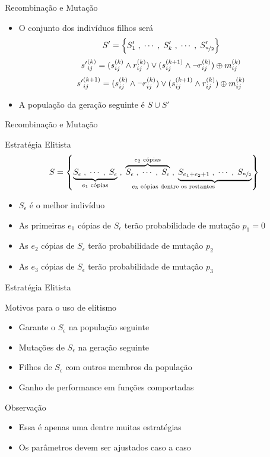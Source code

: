 \begin{frame}{Recombinação e Mutação}
  \begin{itemize}
    \item O conjunto dos indivíduos filhos será
          $$ S' = \left\{ S'_1\;, \;\cdots\;,  \;S'_k\;, \;\cdots\;, \;S'_{\nicefrac{n}{2}} \right\} $$
          $$ {s'}^{(k)}_{ij} = ({s}^{(k)}_{ij} \land {r}^{(k)}_{ij}) \lor ({s}^{(k + 1)}_{ij} \land \lnot {r}^{(k)}_{ij}) \oplus {m}^{(k)}_{ij} $$
          $$ {s'}^{(k + 1)}_{ij} = ({s}^{(k)}_{ij} \land \lnot {r}^{(k)}_{ij}) \lor ({s}^{(k + 1)}_{ij} \land {r}^{(k)}_{ij}) \oplus {m}^{(k)}_{ij} $$
    \item A população da geração seguinte é $ S \cup S' $
  \end{itemize}
\end{frame}

\begin{frame}{Recombinação e Mutação}
  
\end{frame}

\begin{frame}{Estratégia Elitista}
  $$
    S =
    \left\{
    \underbrace{S_{\epsilon}\;, \mathdots,  \;S_{\epsilon}}_{e_1 \text{ cópias}}\;,\;
    \overbrace{S_{\epsilon}\;, \mathdots,  \;S_{\epsilon}}^{e_2 \text{ cópias}}\;,\;
    \underbrace{S_{e_1 + e_2 + 1}\;, \mathdots,  \;S_{\nicefrac{n}{2}}}_{\mathllap{e_3 \text{ cópias dentre os restantes}}}
    \right\}
  $$
  \begin{itemize}
    \item $S_\epsilon$ é o melhor indivíduo
    \item As primeiras $e_1$ cópias de $S_\epsilon$ terão probabilidade de mutação $p_1 = 0$
    \item As $e_2$ cópias de $S_\epsilon$ terão probabilidade de mutação $p_2$
    \item As $e_3$ cópias de $S_\epsilon$ terão probabilidade de mutação $p_3$
  \end{itemize}
\end{frame}

\begin{frame}{Estratégia Elitista}
  \begin{block}{Motivos para o uso de elitismo}
    \begin{itemize}
      \item Garante o $S_\epsilon$ na população seguinte
      \item Mutações de $S_\epsilon$ na geração seguinte
      \item Filhos de $S_\epsilon$ com outros membros da população
      \item Ganho de performance em funções comportadas
    \end{itemize}
  \end{block}
  \begin{alertblock}{Observação}
    \begin{itemize}
      \item Essa é apenas uma dentre muitas estratégias \cite{goldberg1989ga}
      \item Os parâmetros devem ser ajustados caso a caso
    \end{itemize}
  \end{alertblock}
\end{frame}

